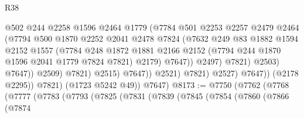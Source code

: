 \begin{lexlean}{R38}
\begin{coremodule}
                                        @502
                                        @244
                                        @2258
                                        @1596
                                        @2464
                                        @1779
                                        (@7784
                                          @501
                                          @2253
                                          @2257
                                          @2479
                                          @2464
                                          (@7794
                                            @500
                                            @1870
                                            @2252
                                            @2041
                                            @2478
                                            @7824
                                            (@7632
                                              @249
                                              @83
                                              @1882
                                              @1594
                                              @2152
                                              @1557
                                              (@7784
                                                @248
                                                @1872
                                                @1881
                                                @2166
                                                @2152
                                                (@7794 @244 @1870 @1596 @2041 @1779 @7824 @7821)
                                                @2179)
                                              @7647))
                                          @2497)
                                        @7821)
                                      @2503)
                                    @7647))
                                @2509)
                              @7821)
                            @2515)
                          @7647))
                      @2521)
                    @7821)
                  @2527)
                @7647))
            (@2178 @2295))
          @7821)
        (@1723 @5242 @49))
      @7647)
@8173 := @7750
    (@7762
      (@7768
        (@7777
          (@7783
            (@7793
              (@7825
                (@7831
                  (@7839
                    (@7845
                      (@7854
                        (@7860
                          (@7866
                            (@7874

\end{coremodule}
\end{lexlean}
